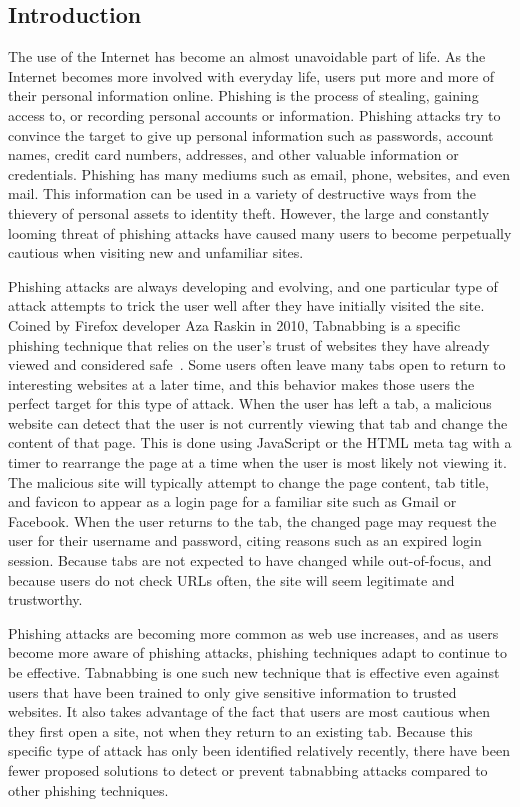 \documentclass[12pt]{article}
\begin{document}
\begin{doublespace}

\section{Introduction}
The use of the Internet has become an almost unavoidable part of life. As the Internet becomes more involved with everyday life, users put more and more of their personal information online. Phishing is the process of stealing, gaining access to, or recording personal accounts or information. Phishing attacks try to convince the target to give up personal information such as passwords, account names, credit card numbers, addresses, and other valuable information or credentials. Phishing has many mediums such as email, phone, websites, and even mail. This information can be used in a variety of destructive ways from the thievery of personal assets to identity theft.  However, the large and constantly looming threat of phishing attacks have caused many users to become perpetually cautious when visiting new and unfamiliar sites.

Phishing attacks are always developing and evolving, and one particular type of attack attempts to trick the user well after they have initially visited the site.  Coined by Firefox developer Aza Raskin in 2010, Tabnabbing is a specific phishing technique that relies on the user’s trust of websites they have already viewed and considered safe~\cite{Raskin}. Some users often leave many tabs open to return to interesting websites at a later time, and this behavior makes those users the perfect target for this type of attack. When the user has left a tab, a malicious website can detect that the user is not currently viewing that tab and change the content of that page. This is done using JavaScript or the HTML meta tag with a timer to rearrange the page at a time when the user is most likely not viewing it. The malicious site will typically attempt to change the page content, tab title, and favicon to appear as a login page for a familiar site such as Gmail or Facebook.  When the user returns to the tab, the changed page may request the user for their username and password, citing reasons such as an expired login session.  Because tabs are not expected to have changed while out-of-focus, and because users do not check URLs often, the site will seem legitimate and trustworthy.

Phishing attacks are becoming more common as web use increases, and as users become more aware of phishing attacks, phishing techniques adapt to continue to be effective. Tabnabbing is one such new technique that is effective even against users that have been trained to only give sensitive information to trusted websites.  It also takes advantage of the fact that users are most cautious when they first open a site, not when they return to an existing tab.  Because this specific type of attack has only been identified relatively recently, there have been fewer proposed solutions to detect or prevent tabnabbing attacks compared to other phishing techniques. 


\end{doublespace}
\end{document}
